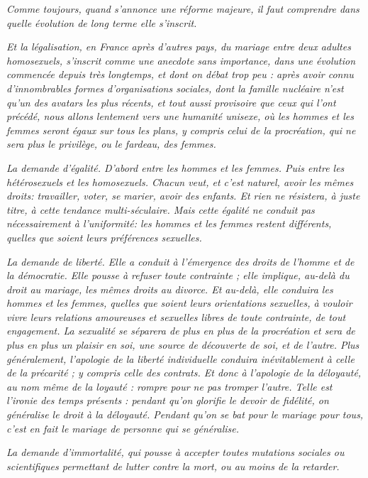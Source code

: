 \begin{displayquote}
\emph{Comme toujours, quand s'annonce une réforme majeure, il faut comprendre dans quelle évolution de long terme elle s'inscrit.}
 
\emph{Et la légalisation, en France après d'autres pays, du mariage entre deux adultes homosexuels, s'inscrit comme une anecdote sans importance, dans une évolution commencée depuis très longtemps, et dont on débat trop peu : après avoir connu d'innombrables formes d'organisations sociales, dont la famille nucléaire n'est qu'un des avatars les plus récents, et tout aussi provisoire que ceux qui l'ont précédé, nous allons lentement vers une humanité unisexe, où les hommes et les femmes seront égaux sur tous les plans, y compris celui de la procréation, qui ne sera plus le privilège, ou le fardeau, des femmes.} 
 
\emph{\primo La demande d'égalité. D'abord entre les hommes et les femmes. Puis entre les hétérosexuels et les homosexuels. Chacun veut, et c'est naturel, avoir les mêmes droits: travailler, voter, se marier, avoir des enfants. Et rien ne résistera, à juste titre, à cette tendance multi-séculaire. Mais cette égalité ne conduit pas nécessairement à l'uniformité: les hommes et les femmes restent différents, quelles que soient leurs préférences sexuelles.}
 
\emph{\secundo La demande de liberté. Elle a conduit à l'émergence des droits de l'homme et de la démocratie. Elle pousse à refuser toute contrainte ; elle implique, au-delà du droit au mariage, les mêmes droits au divorce. Et au-delà, elle conduira les hommes et les femmes, quelles que soient leurs orientations sexuelles, à vouloir vivre leurs relations amoureuses et sexuelles libres de toute contrainte, de tout engagement. La sexualité se séparera de plus en plus de la procréation et sera de plus en plus un plaisir en soi, une source de découverte de soi, et de l'autre. Plus généralement, l'apologie de la liberté individuelle conduira inévitablement à celle de la précarité ; y compris celle des contrats. Et donc à l'apologie de la déloyauté, au nom même de la loyauté : rompre pour ne pas tromper l'autre. Telle est l'ironie des temps présents : pendant qu'on glorifie le devoir de fidélité, on généralise le droit à la déloyauté. Pendant qu'on se bat pour le mariage pour tous, c'est en fait le mariage de personne qui se généralise.}
 
\emph{\tertio La demande d'immortalité, qui pousse à accepter toutes mutations sociales ou scientifiques permettant de lutter contre la mort, ou au moins de la retarder.}
 

\end{displayquote}
